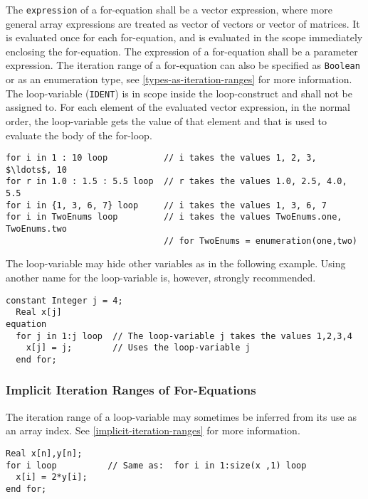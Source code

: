The \lstinline!expression! of a for-equation shall be a vector expression, where more general array expressions are treated as vector of vectors or vector of matrices.  It is evaluated once for each for-equation, and is evaluated in the scope immediately enclosing the for-equation.  The expression of a for-equation shall be a parameter expression.  The iteration range of a for-equation can also be specified as \lstinline!Boolean! or as an enumeration type, see \cref{types-as-iteration-ranges} for more information.  The loop-variable (\lstinline!IDENT!) is in scope inside the loop-construct and shall not be assigned to.  For each element of the evaluated vector expression, in the normal order, the loop-variable gets the value of that element and that is used to evaluate the body of the for-loop.

\begin{example}
\begin{lstlisting}[language=modelica]
for i in 1 : 10 loop           // i takes the values 1, 2, 3, $\ldots$, 10
for r in 1.0 : 1.5 : 5.5 loop  // r takes the values 1.0, 2.5, 4.0, 5.5
for i in {1, 3, 6, 7} loop     // i takes the values 1, 3, 6, 7
for i in TwoEnums loop         // i takes the values TwoEnums.one, TwoEnums.two
                               // for TwoEnums = enumeration(one,two)
\end{lstlisting}

The loop-variable may hide other variables as in the following example.  Using another name for the loop-variable is, however, strongly recommended.
\begin{lstlisting}[language=modelica]
  constant Integer j = 4;
  Real x[j]
equation
  for j in 1:j loop  // The loop-variable j takes the values 1,2,3,4
    x[j] = j;        // Uses the loop-variable j
  end for;
\end{lstlisting}
\end{example}


\subsubsection{Implicit Iteration Ranges of For-Equations}\label{implicit-iteration-ranges-of-for-equations}

The iteration range of a loop-variable may sometimes be inferred from its use as an array index.  See \cref{implicit-iteration-ranges} for more information.

\begin{example}
\begin{lstlisting}[language=modelica]
  Real x[n],y[n];
for i loop          // Same as:  for i in 1:size(x ,1) loop
  x[i] = 2*y[i];
end for;
\end{lstlisting}
\end{example}

